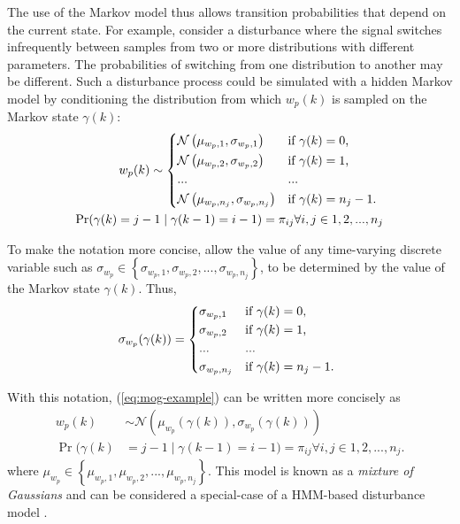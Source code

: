 The use of the Markov model thus allows transition probabilities that depend on the current state. For example, consider a disturbance where the signal switches infrequently between samples from two or more distributions with different parameters. The probabilities of switching from one distribution to another may be different. Such a disturbance process could be simulated with a hidden Markov model by conditioning the distribution from which $w_p(k)$ is sampled on the Markov state $\gamma(k)$:
\begin{equation} \label{eq:mog-example}
	\begin{split}
		w_p(k) \sim 
		\begin{cases*}
			\mathcal{N}\left(\mu_{w_p,1}, \sigma_{w_p,1}\right) & if $\gamma(k)=0$, \\
			\mathcal{N}\left(\mu_{w_p,2}, \sigma_{w_p,2}\right) & if $\gamma(k)=1$, \\
			... & ...\\
			\mathcal{N}\left(\mu_{w_p,n_j}, \sigma_{w_p,n_j}\right) & if $\gamma(k)=n_j-1$.
		\end{cases*} \\
	\Pr(\gamma(k)=j-1 \mid \gamma(k-1)=i-1)=\pi_{ij} \forall i,j \in {1,2,...,n_j}
	\end{split}
\end{equation}

To make the notation more concise, allow the value of any time-varying discrete variable such as $\sigma_{w_p} \in \left\{\sigma_{w_p,1}, \sigma_{w_p,2},..., \sigma_{w_p,n_j}\right\}$, to be determined by the value of the Markov state $\gamma(k)$. Thus,
\begin{equation} \label{eq:A-selection}
	\sigma_{w_p}(\gamma(k)) = 
	\begin{cases*}
		\sigma_{w_p,1} & if $\gamma(k)=0$, \\
		\sigma_{w_p,2} & if $\gamma(k)=1$, \\
		... & ...\\
		\sigma_{w_p,n_j} & if $\gamma(k)=n_j-1$.
	\end{cases*}
\end{equation}


With this notation, (\ref{eq:mog-example}) can be written more concisely as
\begin{equation} \label{eq:mog-example2}
	\begin{aligned}
		w_p(k) &\sim \mathcal{N}\left(\mu_{w_p}(\gamma(k)), \sigma_{w_p}(\gamma(k))\right) \\
		\Pr(\gamma(k) &= j-1 \mid \gamma(k-1)=i-1)=\pi_{ij} \forall i,j \in {1,2,...,n_j}.
	\end{aligned}
\end{equation}
where $\mu_{w_p}\in\left\{\mu_{w_p,1},\mu_{w_p,2},...,\mu_{w_p,n_j}\right\}$. This model is known as a \textit{mixture of Gaussians} and can be considered a special-case of a HMM-based disturbance model \citep{wong_disturbance_2007}.

